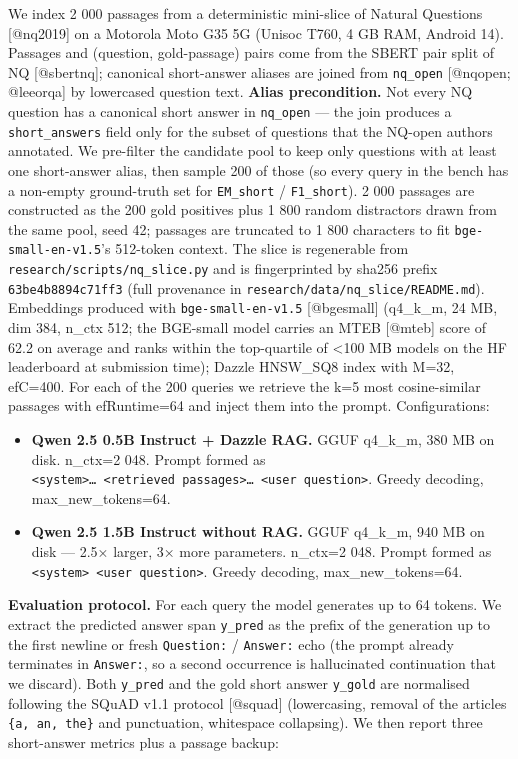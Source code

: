 We index 2 000 passages from a deterministic mini-slice of Natural Questions
{[}@nq2019{]} on a Motorola Moto G35 5G (Unisoc T760, 4 GB RAM, Android 14).
Passages and (question, gold-passage) pairs come from the SBERT pair split of NQ
{[}@sbertnq{]}; canonical short-answer aliases are joined from \texttt{nq\_open}
{[}@nqopen; @leeorqa{]} by lowercased question text. \textbf{Alias
precondition.} Not every NQ question has a canonical short answer in
\texttt{nq\_open} --- the join produces a \texttt{short\_answers} field only for
the subset of questions that the NQ-open authors annotated. We pre-filter the
candidate pool to keep only questions with at least one short-answer alias, then
sample 200 of those (so every query in the bench has a non-empty ground-truth
set for \texttt{EM\_short} / \texttt{F1\_short}). 2 000 passages are constructed
as the 200 gold positives plus 1 800 random distractors drawn from the same
pool, seed 42; passages are truncated to 1 800 characters to fit
\texttt{bge-small-en-v1.5}'s 512-token context. The slice is regenerable from
\texttt{research/scripts/nq\_slice.py} and is fingerprinted by sha256 prefix
\texttt{63be4b8894c71ff3} (full provenance in
\texttt{research/data/nq\_slice/README.md}). Embeddings produced with
\texttt{bge-small-en-v1.5} {[}@bgesmall{]} (q4\_k\_m, 24 MB, dim 384, n\_ctx
512; the BGE-small model carries an MTEB {[}@mteb{]} score of 62.2 on average
and ranks within the top-quartile of \textless100 MB models on the HF
leaderboard at submission time); Dazzle HNSW\_SQ8 index with M=32, efC=400. For
each of the 200 queries we retrieve the k=5 most cosine-similar passages with
efRuntime=64 and inject them into the prompt. Configurations:

\begin{itemize}
\tightlist
\item
  \textbf{Qwen 2.5 0.5B Instruct + Dazzle RAG.} GGUF q4\_k\_m, 380 MB on disk.
  n\_ctx=2 048. Prompt formed as
  \texttt{\textless{}system\textgreater{}…\ \textless{}retrieved\ passages\textgreater{}…\ \textless{}user\ question\textgreater{}}.
  Greedy decoding, max\_new\_tokens=64.
\item
  \textbf{Qwen 2.5 1.5B Instruct without RAG.} GGUF q4\_k\_m, 940 MB on disk ---
  2.5× larger, 3× more parameters. n\_ctx=2 048. Prompt formed as
  \texttt{\textless{}system\textgreater{}\ \textless{}user\ question\textgreater{}}.
  Greedy decoding, max\_new\_tokens=64.
\end{itemize}

\textbf{Evaluation protocol.} For each query the model generates up to 64
tokens. We extract the predicted answer span \texttt{y\_pred} as the prefix of
the generation up to the first newline or fresh \texttt{Question:} /
\texttt{Answer:} echo (the prompt already terminates in \texttt{Answer:}, so a
second occurrence is hallucinated continuation that we discard). Both
\texttt{y\_pred} and the gold short answer \texttt{y\_gold} are normalised
following the SQuAD v1.1 protocol {[}@squad{]} (lowercasing, removal of the
articles \texttt{\{a,\ an,\ the\}} and punctuation, whitespace collapsing). We
then report three short-answer metrics plus a passage backup:

